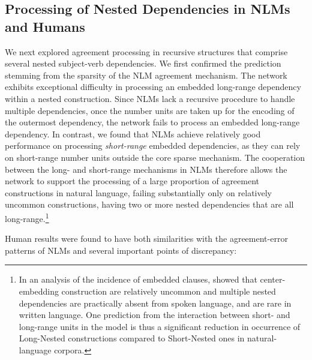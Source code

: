 \subsection{Processing of Nested Dependencies in NLMs and Humans}
We next explored agreement processing in recursive structures that comprise several nested subject-verb dependencies. We first confirmed the prediction stemming from the sparsity of the NLM agreement mechanism. The network exhibits exceptional difficulty in processing an embedded long-range dependency within a nested construction. Since NLMs lack a recursive procedure to handle multiple dependencies, once the number units are taken up for the encoding of the outermost dependency, the network fails to process an embedded long-range dependency. In contrast, we found that NLMs achieve relatively good performance on processing \textit{short-range} embedded dependencies, as they can rely on short-range number units outside the core sparse mechanism. The cooperation between the long- and short-range mechanisms in NLMs therefore allows the network to support the processing of a large proportion of agreement constructions in natural language, failing substantially only on relatively uncommon constructions, having two or more nested dependencies that are all long-range.\footnote{In an analysis of the incidence of embedded clauses, \citet{karlsson2007constraints} showed that center-embedding construction are relatively uncommon and multiple nested dependencies are practically absent from spoken language, and are rare in written language. One prediction from the interaction between short- and long-range units in the model is thus a significant reduction in occurrence of Long-Nested constructions compared to Short-Nested ones in natural-language corpora.}

Human results were found to have both similarities with the agreement-error patterns of NLMs and several important points of discrepancy:

